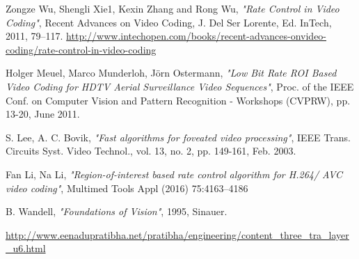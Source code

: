 \documentclass[11pt]{article} %
\begin{document}
\begin{thebibliography}{9}
Zongze Wu, Shengli Xie1, Kexin Zhang and Rong Wu, \textit{"Rate Control in Video Coding"},
Recent Advances on Video Coding, J. Del Ser Lorente, Ed. InTech,
2011, 79–117. \url{http://www.intechopen.com/books/recent-advances-onvideo-coding/rate-control-in-video-coding}

Holger Meuel, Marco Munderloh, Jörn Ostermann, \textit{"Low Bit Rate ROI Based Video Coding for HDTV Aerial Surveillance Video Sequences"}, 
Proc. of the IEEE Conf. on Computer Vision and Pattern Recognition - Workshops (CVPRW), pp. 13-20, June 2011.

S. Lee, A. C. Bovik, \textit{"Fast algorithms for foveated video processing"},
IEEE Trans. Circuits Syst. Video Technol., vol. 13, no. 2, pp. 149-161, Feb. 2003.

Fan Li, Na Li, \textit{"Region-of-interest based rate control algorithm for H.264/
AVC video coding"},
Multimed Tools Appl (2016) 75:4163–4186
 
B. Wandell, \textit{"Foundations of Vision"}, 1995, Sinauer.

\url{http://www.eenadupratibha.net/pratibha/engineering/content_three_tra_layer_u6.html}
\end{thebibliography}
\end{document}
